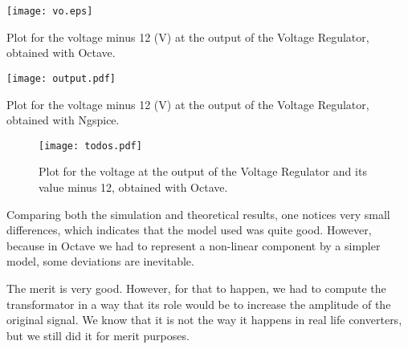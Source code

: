 \begin{minipage}[b]{0.48\textwidth}
\centering
\texttt{[image: vo.eps]}
\captionsetup{type=figure}
\caption{Plot for the voltage minus 12 (V) at the output of the Voltage Regulator, obtained with Octave.}
\label{vo_octave}
\end{minipage}
\begin{minipage}[b]{0.48\textwidth}
\centering
\texttt{[image: output.pdf]}
\captionsetup{type=figure}
\caption{Plot for the voltage minus 12 (V) at the output of the Voltage Regulator, obtained with Ngspice.}
\label{vo_ngspice}
\end{minipage} 




\begin{figure}[h] \centering
\texttt{[image: todos.pdf]}
\caption{Plot for the voltage at the output of the Voltage Regulator and its value minus 12, obtained with Octave.}
\label{todos!!}
\end{figure}


\renewcommand{\arraystretch}{1.5}
%     
\vspace{3mm}
\par Comparing both the simulation and theoretical results, one notices very small differences, which indicates that the model used was quite good. However, because in Octave we had to represent a non-linear component by a simpler model, some deviations are inevitable.
\vspace{3mm}
\par The merit is very good. However, for that to happen, we had to compute the transformator in a way that its role would be to increase the amplitude of the original signal. We know that it is not the way it happens in real life converters, but we still did it for merit purposes.
\vspace{5mm}







